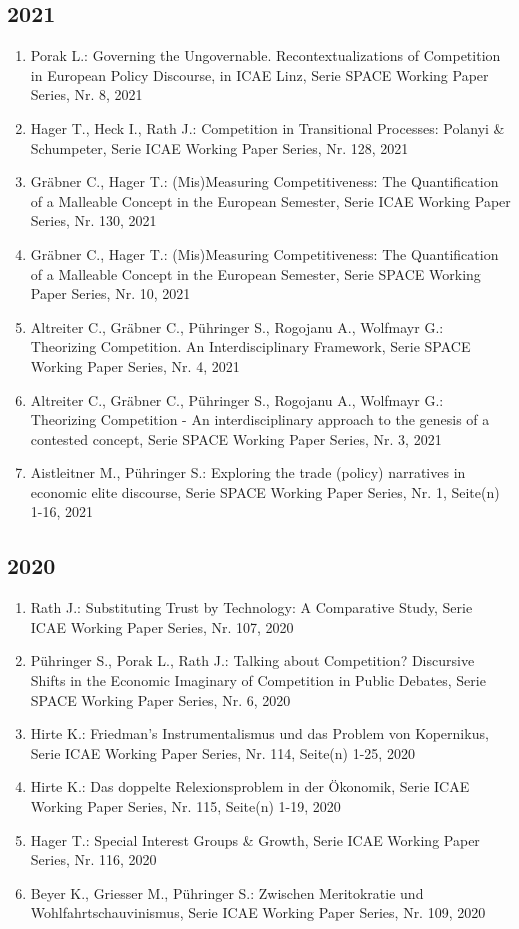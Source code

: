 \subsection*{2021}
\begin{enumerate}
    	 \item Porak L.: Governing the Ungovernable. Recontextualizations of Competition in European Policy Discourse, in ICAE Linz, Serie SPACE Working Paper Series, Nr. 8, 2021
	 \item Hager T., Heck I., Rath J.: Competition in Transitional Processes: Polanyi \& Schumpeter, Serie ICAE Working Paper Series, Nr. 128, 2021
	 \item Gräbner C., Hager T.: (Mis)Measuring Competitiveness: The Quantification of a Malleable Concept in the European Semester, Serie ICAE Working Paper Series, Nr. 130, 2021
	 \item Gräbner C., Hager T.: (Mis)Measuring Competitiveness: The Quantification of a Malleable Concept in the European Semester, Serie SPACE Working Paper Series, Nr. 10, 2021
	 \item Altreiter C., Gräbner C., Pühringer S., Rogojanu A., Wolfmayr G.: Theorizing Competition. An Interdisciplinary Framework, Serie SPACE Working Paper Series, Nr. 4, 2021
	 \item Altreiter C., Gräbner C., Pühringer S., Rogojanu A., Wolfmayr G.: Theorizing Competition - An interdisciplinary approach to the genesis of a contested concept, Serie SPACE Working Paper Series, Nr. 3, 2021
	 \item Aistleitner M., Pühringer S.: Exploring the trade (policy) narratives in economic elite discourse, Serie SPACE Working Paper Series, Nr. 1, Seite(n) 1-16, 2021
\end{enumerate}
\subsection*{2020}
\begin{enumerate}
    	 \item Rath J.: Substituting Trust by Technology: A Comparative Study, Serie ICAE Working Paper Series, Nr. 107, 2020
	 \item Pühringer S., Porak L., Rath J.: Talking about Competition? Discursive Shifts in the Economic Imaginary of Competition in Public Debates, Serie SPACE Working Paper Series, Nr. 6, 2020
	 \item Hirte K.: Friedman’s Instrumentalismus und das Problem von Kopernikus, Serie ICAE Working Paper Series, Nr. 114, Seite(n) 1-25, 2020
	 \item Hirte K.: Das doppelte Relexionsproblem in der Ökonomik, Serie ICAE Working Paper Series, Nr. 115, Seite(n) 1-19, 2020
	 \item Hager T.: Special Interest Groups \& Growth, Serie ICAE Working Paper Series, Nr. 116, 2020
	 \item Beyer K., Griesser M., Pühringer S.: Zwischen Meritokratie und Wohlfahrtschauvinismus, Serie ICAE Working Paper Series, Nr. 109, 2020
\end{enumerate}
